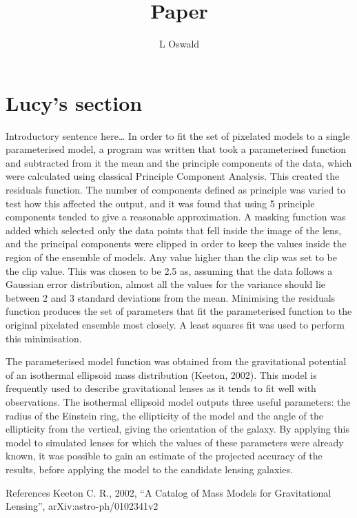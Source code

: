\documentclass{article}
\begin{document}
\title{Paper}
\author{L Oswald}
\date{}

\maketitle



\section{Lucy's section}

Introductory sentence here…
In order to fit the set of pixelated models to a single parameterised model, a program was written that took a parameterised function and subtracted from it the mean and the principle components of the data, which were calculated using classical Principle Component Analysis. This created the residuals function. The number of components defined as principle was varied to test how this affected the output, and it was found that using 5 principle components tended to give a reasonable approximation. A masking function was added which selected only the data points that fell inside the image of the lens, and the principal components were clipped in order to keep the values inside the region of the ensemble of models. Any value higher than the clip was set to be the clip value. This was chosen to be 2.5 as, assuming that the data follows a Gaussian error distribution, almost all the values for the variance should lie between 2 and 3 standard deviations from the mean. Minimising the residuals function produces the set of parameters that fit the parameterised function to the original pixelated ensemble most closely. A least squares fit was used to perform this minimisation. 

The parameterised model function was obtained from the gravitational potential of an isothermal ellipsoid mass distribution (Keeton, 2002). This model is frequently used to describe gravitational lenses as it tends to fit well with observations. The isothermal ellipsoid model outputs three useful parameters: the radius of the Einstein ring, the ellipticity of the model and the angle of the ellipticity from the vertical, giving the orientation of the galaxy. By applying this model to simulated lenses for which the values of these parameters were already known, it was possible to gain an estimate of the projected accuracy of the results, before applying the model to the candidate lensing galaxies.



References
Keeton C. R., 2002, “A Catalog of Mass Models for Gravitational Lensing”, arXiv:astro-ph/0102341v2
\end{document}
